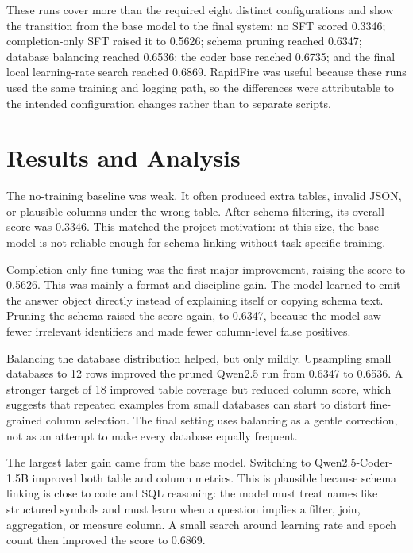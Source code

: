 \documentclass{article}
\begin{document}
These runs cover more than the required eight distinct configurations and show the transition from
the base model to the final system: no SFT scored 0.3346; completion-only SFT raised it to 0.5626;
schema pruning reached 0.6347; database balancing reached 0.6536; the coder base reached 0.6735;
and the final local learning-rate search reached 0.6869. RapidFire was useful because these runs used
the same training and logging path, so the differences were attributable to the intended configuration
changes rather than to separate scripts.

\section{Results and Analysis}
\enlargethispage{2\baselineskip}

The no-training baseline was weak. It often produced extra tables, invalid JSON, or plausible columns
under the wrong table. After schema filtering, its overall score was 0.3346. This matched the project
motivation: at this size, the base model is not reliable enough for schema linking without task-specific
training.

Completion-only fine-tuning was the first major improvement, raising the score to 0.5626. This was
mainly a format and discipline gain. The model learned to emit the answer object directly instead of
explaining itself or copying schema text. Pruning the schema raised the score again, to 0.6347, because
the model saw fewer irrelevant identifiers and made fewer column-level false positives.

Balancing the database distribution helped, but only mildly. Upsampling small databases to 12 rows
improved the pruned Qwen2.5 run from 0.6347 to 0.6536. A stronger target of 18 improved table
coverage but reduced column score, which suggests that repeated examples from small databases can
start to distort fine-grained column selection. The final setting uses balancing as a gentle correction,
not as an attempt to make every database equally frequent.

The largest later gain came from the base model. Switching to Qwen2.5-Coder-1.5B improved both
table and column metrics. This is plausible because schema linking is close to code and SQL reasoning:
the model must treat names like structured symbols and must learn when a question implies a filter,
join, aggregation, or measure column. A small search around learning rate and epoch count then
improved the score to 0.6869.
\end{document}
